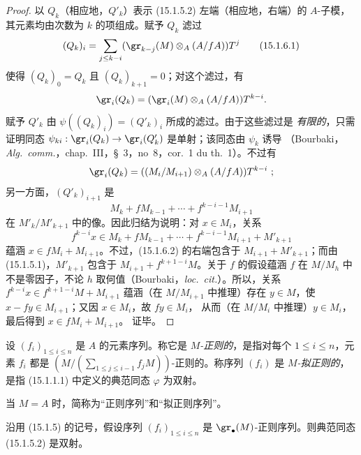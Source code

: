 \begin{proof}
以 $Q_k$（相应地，$Q'_k$）表示 (15.1.5.2) 左端（相应地，右端）的
$A$-子模，其元素均由次数为 $k$ 的项组成。赋予 $Q_k$ 滤过
\[
  (Q_k)_i=\sum_{j\leq k-i}
  (\gr_{k-j}(M)\otimes_A(A/fA))T^j
  \tag{15.1.6.1}\label{0.15.1.6.1-fr}
\]
使得 $(Q_k)_0=Q_k$ 且 $(Q_k)_{k+1}=0$；对这个滤过，有
\[
  \gr_i(Q_k)=(\gr_i(M)\otimes_A(A/fA))T^{k-i}.
\]
赋予 $Q'_k$ 由 $\psi((Q_k)_i)=(Q'_k)_i$ 所成的滤过。由于这些滤过是
\emph{有限的}，只需证明同态
$\psi_{ki}:\gr_i(Q_k)\to\gr_i(Q'_k)$ 是单射；该同态由 $\psi_k$ 诱导
（Bourbaki，\emph{Alg.~comm.}，chap.~III，\S~3，no~8，cor.~1 du th.~1）。不过有
\[
  \gr_i(Q_k)=((M_i/M_{i+1})\otimes_A(A/fA))T^{k-i}~;
\]
另一方面，$(Q'_k)_{i+1}$ 是
\[
  M_k+fM_{k-1}+\cdots+f^{k-i-1}M_{i+1}
\]
在 $M'_k/M'_{k+1}$ 中的像。因此归结为说明：对 $x\in M_i$，关系
\[
  f^{k-i}x\in M_k+fM_{k-1}+\cdots+
  f^{k-i-1}M_{i+1}+M'_{k+1}
  \tag{15.1.6.2}\label{0.15.1.6.2-fr}
\]
蕴涵 $x\in fM_i+M_{i+1}$。不过，(15.1.6.2) 的右端包含于
$M_{i+1}+M'_{k+1}$；而由 (15.1.5.1)，$M'_{k+1}$ 包含于
$M_{i+1}+f^{k+1-i}M$。关于 $f$ 的假设蕴涵 $f$ 在 $M/M_h$ 中
不是零因子，不论 $h$ 取何值（Bourbaki，\emph{loc.~cit.}）。所以，关系
$f^{k-i}x\in f^{k+1-i}M+M_{i+1}$ 蕴涵（在 $M/M_{i+1}$ 中推理）存在
$y\in M$，使 $x-fy\in M_{i+1}$；又因 $x\in M_i$，故 $fy\in M_i$，
从而（在 $M/M_i$ 中推理）$y\in M_i$，最后得到 $x\in fM_i+M_{i+1}$。
证毕。
\end{proof}

\begin{definition}[15.1.7]
\label{0.15.1.7-fr}
设 $(f_i)_{1\leq i\leq n}$ 是 $A$ 的元素序列。称它是
\emph{$M$-正则的}，是指对每个 $1\leq i\leq n$，元素 $f_i$ 都是
$\left(M/(\sum_{1\leq j\leq i-1}f_jM)\right)$-正则的。称序列 $(f_i)$ 是
\emph{$M$-拟正则的}，是指 (15.1.1.1) 中定义的典范同态 $\varphi$ 为双射。

当 $M=A$ 时，简称为“正则序列”和“拟正则序列”。
\end{definition}

\begin{proposition}[15.1.8]
\label{0.15.1.8-fr}
沿用 (15.1.5) 的记号，假设序列 $(f_i)_{1\leq i\leq n}$ 是
$\gr_\bullet(M)$-正则序列。则典范同态 (15.1.5.2) 是双射。
\end{proposition}

